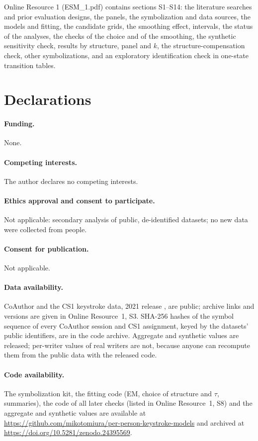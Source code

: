 \documentclass[pdflatex,sn-basic]{sn-jnl}
\newcommand{\Sref}[1]{Online Resource~1, S#1}
\begin{document}
\backmatter

Online Resource 1 (ESM\_1.pdf) contains sections S1--S14: the literature searches and prior evaluation designs, the panels, the symbolization and data sources, the models and fitting, the candidate grids, the smoothing effect, intervals, the status of the analyses, the checks of the choice and of the smoothing, the synthetic sensitivity check, results by structure, panel and $k$, the structure-compensation check, other symbolizations, and an exploratory identification check in one-state transition tables.

\section*{Declarations}
\paragraph{Funding.} None.
\paragraph{Competing interests.} The author declares no competing interests.
\paragraph{Ethics approval and consent to participate.} Not applicable: secondary analysis of public, de-identified datasets; no new data were collected from people.
\paragraph{Consent for publication.} Not applicable.
\paragraph{Data availability.} CoAuthor \citep{Lee2022} and the CS1 keystroke data, 2021 release \citep{Edwards2023}, are public; archive links and versions are given in \Sref{3}. SHA-256 hashes of the symbol sequence of every CoAuthor session and CS1 assignment, keyed by the datasets' public identifiers, are in the code archive. Aggregate and synthetic values are released; per-writer values of real writers are not, because anyone can recompute them from the public data with the released code.
\paragraph{Code availability.} The symbolization kit, the fitting code (EM, choice of structure and $\tau$, summaries), the code of all later checks (listed in \Sref{8}) and the aggregate and synthetic values are available at \url{https://github.com/mikotomiura/per-person-keystroke-models} and archived at \url{https://doi.org/10.5281/zenodo.24395569}.
\end{document}
